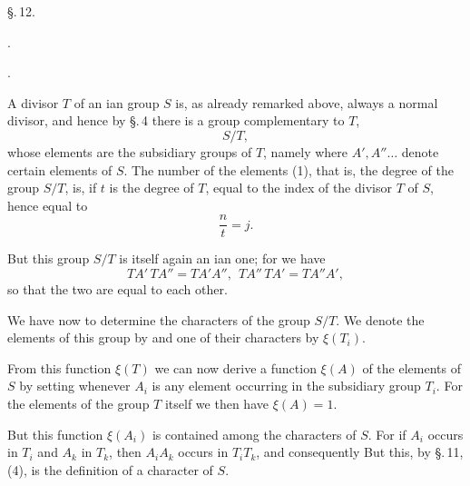 
\begin{center}
\S.\,12.

.

.
\end{center}

A divisor $T$ of an ian group $S$ is, as already remarked above, always a normal divisor, and hence by \S.\,4 there is a group complementary to $T$,
\[
S/T,
\]
whose elements are the subsidiary groups of $T$, namely
where $A', A'' \ldots$ denote certain elements of $S$. The number of the elements (1), that is, the degree of the group $S/T$, is, if $t$ is the degree of $T$, equal to the index of the divisor $T$ of $S$, hence equal to
\[
\frac{n}{t} = j.
\]

But this group $S/T$ is itself again an ian one; for we have
\[
TA'\,TA'' = TA'A'',\ \ TA''\,TA' = TA''A',
\]
so that the two are equal to each other.

We have now to determine the characters of the group $S/T$. We denote the elements of this group by
and one of their characters by $\xi(T_i)$.

From this function $\xi(T)$ we can now derive a function $\xi(A)$ of the elements of $S$ by setting
whenever $A_i$ is any element occurring in the subsidiary group $T_i$. For the elements of the group $T$ itself we then have $\xi(A) = 1$.

But this function $\xi(A_i)$ is contained among the characters of $S$. For if $A_i$ occurs in $T_i$ and $A_k$ in $T_k$, then $A_iA_k$ occurs in $T_iT_k$, and consequently
But this, by \S.\,11,(4), is the definition of a character of $S$.
